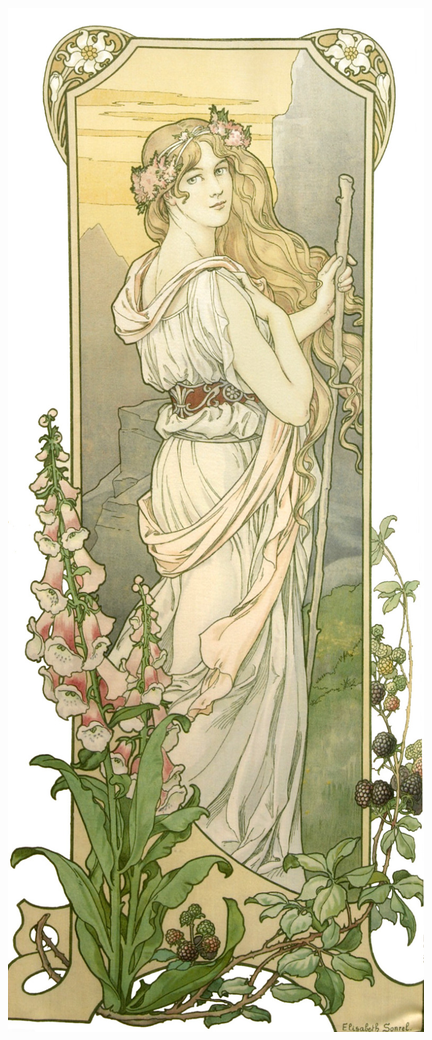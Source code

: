 
\thispagestyle{empty}

\begin{multicols}{2}
\vspace*{120pt}
\begin{figure}[H]
	\centering
	
	\includegraphics[width=0.99\columnwidth]{Immagini/MotherNaturecompress.png}

\end{figure}
\end{multicols}
